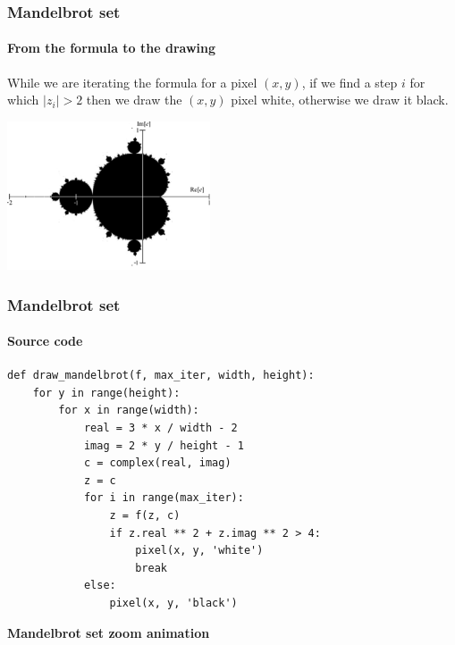 \documentclass[9pt]{beamer}
\begin{document}
\begin{frame}
  \frametitle{Mandelbrot set}

  \framesubtitle{From the formula to the drawing}

  While we are iterating the formula for a pixel $(x, y)$, if we find
  a step $i$ for which $|z_{i}| > 2$ then we draw the $(x, y)$ pixel
  white, otherwise we draw it black.

  \bigskip

  \begin{center}
    \includegraphics[width = 6cm]{images/mandelbrot_simple.png}
  \end{center}

\end{frame}

\begin{frame}[fragile]
  \frametitle{Mandelbrot set}

  \framesubtitle{Source code}

  \begin{lstlisting}
def draw_mandelbrot(f, max_iter, width, height):
    for y in range(height):
        for x in range(width):
            real = 3 * x / width - 2
            imag = 2 * y / height - 1
            c = complex(real, imag)
            z = c
            for i in range(max_iter):
                z = f(z, c)
                if z.real ** 2 + z.imag ** 2 > 4:
                    pixel(x, y, 'white')
                    break
            else:
                pixel(x, y, 'black')
  \end{lstlisting}
\end{frame}

\begin{frame}
  \begin{center}
    {\Huge \bf{Mandelbrot set zoom animation}}
  \end{center}
\end{frame}
\end{document}
